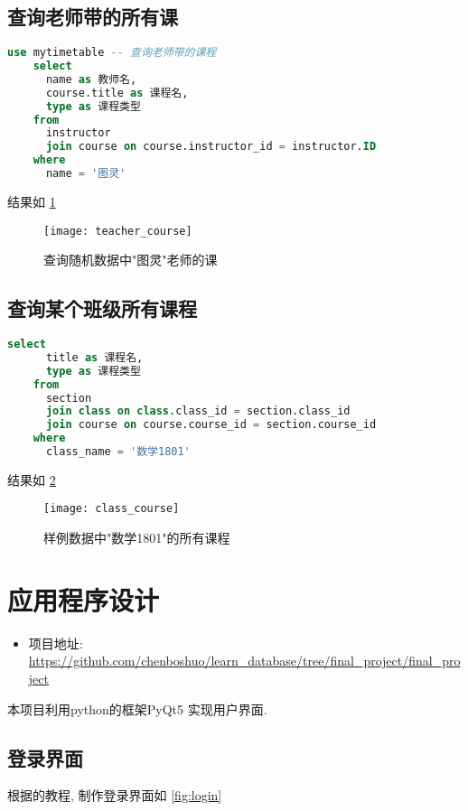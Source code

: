 \documentclass{myreport}
\begin{document}
  \subsection{查询老师带的所有课}
    \begin{lstlisting}[language=sql]
    use mytimetable -- 查询老师带的课程
    select
      name as 教师名,
      course.title as 课程名,
      type as 课程类型
    from
      instructor
      join course on course.instructor_id = instructor.ID
    where
      name = '图灵'
    \end{lstlisting}
    结果如
    \cref{fig:teacher_course}
    \begin{figure}[H]
      \centering
      \texttt{[image: teacher\_course]}
      \caption{查询随机数据中"图灵"老师的课}
      \label{fig:teacher_course}
    \end{figure}

  \subsection{查询某个班级所有课程}
    \begin{lstlisting}[language=sql]
    select
      title as 课程名,
      type as 课程类型
    from
      section
      join class on class.class_id = section.class_id
      join course on course.course_id = section.course_id
    where
      class_name = '数学1801'
    \end{lstlisting}
    结果如
    \cref{fig:class_course}
    \begin{figure}[H]
      \centering
      \texttt{[image: class\_course]}
      \caption{样例数据中"数学1801"的所有课程}
      \label{fig:class_course}
    \end{figure}

\section{应用程序设计}
  \begin{itemize}
    \item 项目地址:
    \url{https://github.com/chenboshuo/learn_database/tree/final_project/final_project}
  \end{itemize}
  本项目利用python的框架PyQt5  实现用户界面.

  \subsection{登录界面}
    根据\cite{pyqt5_login}的教程, 制作登录界面如
    \cref{fig:login}
\end{document}
